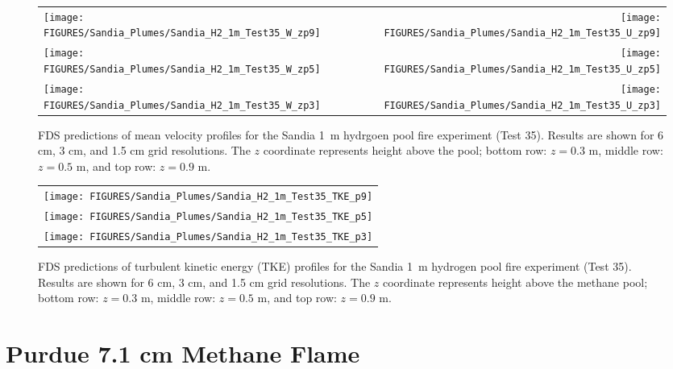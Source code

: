 \newpage

\begin{figure}[p]
\begin{tabular*}{\textwidth}{l@{\extracolsep{\fill}}r}
\texttt{[image: FIGURES/Sandia\_Plumes/Sandia\_H2\_1m\_Test35\_W\_zp9]} &
\texttt{[image: FIGURES/Sandia\_Plumes/Sandia\_H2\_1m\_Test35\_U\_zp9]} \\
\texttt{[image: FIGURES/Sandia\_Plumes/Sandia\_H2\_1m\_Test35\_W\_zp5]} &
\texttt{[image: FIGURES/Sandia\_Plumes/Sandia\_H2\_1m\_Test35\_U\_zp5]} \\
\texttt{[image: FIGURES/Sandia\_Plumes/Sandia\_H2\_1m\_Test35\_W\_zp3]} &
\texttt{[image: FIGURES/Sandia\_Plumes/Sandia\_H2\_1m\_Test35\_U\_zp3]}
\end{tabular*}
\caption[Sandia 1~m hydrogen pool fire (Test 35) mean velocity profiles]
{FDS predictions of mean velocity profiles for the Sandia 1~m hydrgoen pool fire experiment (Test 35). Results are shown for 6 cm, 3 cm, and 1.5 cm grid resolutions. The $z$ coordinate represents height above the pool; bottom row: $z=0.3$ m, middle row: $z=0.5$ m, and top row: $z=0.9$ m.}
\label{Sandia_H2_1m_Test35_velocity}
\end{figure}

\begin{figure}[p]
\begin{center}
\begin{tabular}{c}
\texttt{[image: FIGURES/Sandia\_Plumes/Sandia\_H2\_1m\_Test35\_TKE\_p9]} \\
\texttt{[image: FIGURES/Sandia\_Plumes/Sandia\_H2\_1m\_Test35\_TKE\_p5]} \\
\texttt{[image: FIGURES/Sandia\_Plumes/Sandia\_H2\_1m\_Test35\_TKE\_p3]}
\end{tabular}
\caption[Sandia 1~m hydrogen pool fire (Test 25) turbulent kinetic energy]
{FDS predictions of turbulent kinetic energy (TKE) profiles for the Sandia 1~m hydrogen pool fire experiment (Test 35). Results are shown for 6 cm, 3 cm, and 1.5 cm grid resolutions. The $z$ coordinate represents height above the methane pool; bottom row: $z=0.3$ m, middle row: $z=0.5$ m, and top row: $z=0.9$ m.}
\label{Sandia_H2_1m_Test35_tke}
\end{center}
\end{figure}


\clearpage

\section{Purdue 7.1 cm Methane Flame}
\label{Purdue_Flames}

